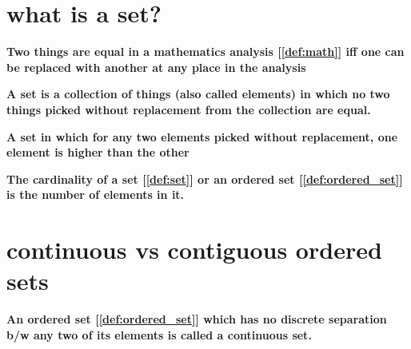 \documentclass[../main.tex]{subfiles}
\begin{document}
\section{what is a set?}

\begin{definition}
  \label{def:equality}

  \textbf{Two things are equal in a mathematics analysis [\ref{def:math}] iff one can be replaced with another at any place in the analysis}

\end{definition}


\begin{definition}
  \label{def:set}

  \textbf{A set is a collection of things (also called elements) in which no two things picked without replacement from the collection are equal.}

\end{definition}

\begin{definition}
  \label{def:ordered_set}

  \textbf{A set in which for any two elements picked without replacement, one element is higher than the other}

\end{definition}

\begin{definition}
  \label{def:set_cardinality}

  \textbf{The cardinality of a set [\ref{def:set}] or an ordered set [\ref{def:ordered_set}] is the number of elements in it.}

\end{definition}

\pagebreak
\section{continuous vs contiguous ordered sets}

\begin{definition}
  \label{def:continuous_set}

  \textbf{An ordered set [\ref{def:ordered_set}] which has no discrete separation b/w any two of its elements is called a continuous set.}

\end{definition}
\end{document}
